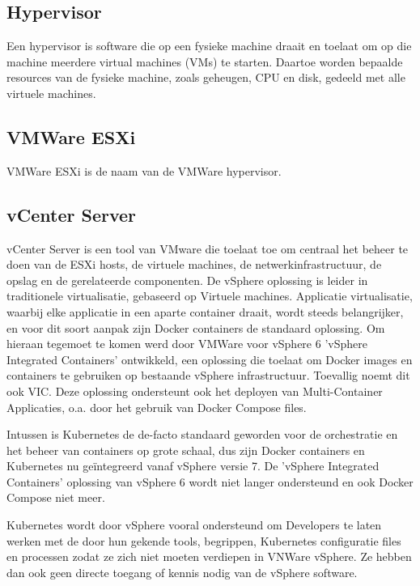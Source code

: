 \autocite{Saelens2023}

\subsection{Hypervisor}
Een hypervisor is software die op een fysieke machine draait en toelaat om op die machine meerdere virtual machines (VMs) te starten. Daartoe worden bepaalde resources van de fysieke machine, zoals geheugen, CPU en disk, gedeeld met alle virtuele machines.\autocite{VMware2023a}

\subsection{VMWare ESXi}
VMWare ESXi is de naam van de VMWare hypervisor.\autocite{VMware2023}

\subsection{vCenter Server}
vCenter Server is een tool van VMware die toelaat toe om centraal het beheer te doen van de ESXi hosts, de virtuele machines, de netwerkinfrastructuur, de opslag en de gerelateerde componenten.\autocite{Abbas2023}
\newline
\newline
De vSphere oplossing is leider in traditionele virtualisatie, gebaseerd op Virtuele machines. Applicatie virtualisatie, waarbij elke applicatie in een aparte container draait, wordt steeds belangrijker, en voor dit soort aanpak zijn Docker containers de standaard oplossing. Om hieraan tegemoet te komen werd door VMWare voor vSphere 6 'vSphere Integrated Containers' ontwikkeld, een oplossing die toelaat om Docker images en containers te gebruiken op bestaande vSphere infrastructuur. Toevallig noemt dit ook VIC.
Deze oplossing ondersteunt ook het deployen van Multi-Container Applicaties, o.a. door het gebruik van Docker Compose files.

\autocite{VMware2023b}


Intussen is Kubernetes de de-facto standaard geworden voor de orchestratie en het beheer van containers op grote schaal, dus zijn Docker containers en Kubernetes nu geïntegreerd vanaf vSphere versie 7. De 'vSphere Integrated Containers' oplossing van vSphere 6 wordt niet langer ondersteund en ook Docker Compose niet meer.

\autocite{VMware2021}


Kubernetes wordt door vSphere vooral ondersteund om Developers te laten werken met de door hun gekende tools, begrippen, Kubernetes configuratie files en processen zodat ze zich niet moeten verdiepen in VNWare vSphere. Ze hebben dan ook geen directe toegang of kennis nodig van de vSphere software.\autocite{VMware2019}

